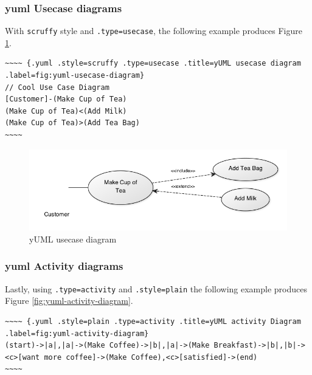 \documentclass[]{article}
\begin{document}
\newpage

\subsubsection{yuml Usecase diagrams}\label{yuml-usecase-diagrams}

With \texttt{scruffy} style and \texttt{.type=usecase}, the following
example produces Figure \ref{fig:yuml-usecase-diagram}.

\scriptsize

\begin{verbatim}
~~~~ {.yuml .style=scruffy .type=usecase .title=yUML usecase diagram .label=fig:yuml-usecase-diagram}
// Cool Use Case Diagram
[Customer]-(Make Cup of Tea)
(Make Cup of Tea)<(Add Milk)
(Make Cup of Tea)>(Add Tea Bag)
~~~~
\end{verbatim}

\normalsize

\begin{figure}[htbp]
\centering
\includegraphics{tmp/ppp-render-_6_eB/image-7.png}
\caption{yUML usecase diagram\label{fig:yuml-usecase-diagram}}
\end{figure}

\newpage

\subsubsection{yuml Activity diagrams}\label{yuml-activity-diagrams}

Lastly, using \texttt{.type=activity} and \texttt{.style=plain} the
following example produces Figure \ref{fig:yuml-activity-diagram}.

\scriptsize

\begin{verbatim}
~~~~ {.yuml .style=plain .type=activity .title=yUML activity Diagram .label=fig:yuml-activity-diagram}
(start)->|a|,|a|->(Make Coffee)->|b|,|a|->(Make Breakfast)->|b|,|b|-><c>[want more coffee]->(Make Coffee),<c>[satisfied]->(end)
~~~~
\end{verbatim}
\end{document}
